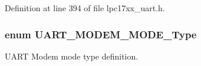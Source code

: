 Definition at line 394 of file lpc17xx\+\_\+uart.\+h.

\subsubsection[{\texorpdfstring{U\+A\+R\+T\+\_\+\+M\+O\+D\+E\+M\+\_\+\+M\+O\+D\+E\+\_\+\+Type}{UART_MODEM_MODE_Type}}]{\setlength{\rightskip}{0pt plus 5cm}enum {\bf U\+A\+R\+T\+\_\+\+M\+O\+D\+E\+M\+\_\+\+M\+O\+D\+E\+\_\+\+Type}}\hypertarget{group___u_a_r_t___public___types_ga55fc73bec4c58ad15d24b05095c4523a}{}\label{group___u_a_r_t___public___types_ga55fc73bec4c58ad15d24b05095c4523a}


U\+A\+RT Modem mode type definition. 

